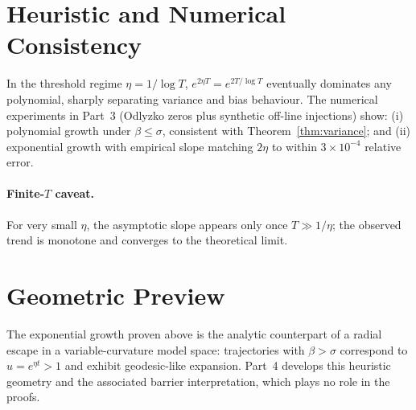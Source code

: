 \section{Heuristic and Numerical Consistency}\label{sec:numerics}

In the threshold regime $\eta=1/\log T$, $e^{2\eta T}=e^{2T/\log T}$
eventually dominates any polynomial, sharply separating variance and bias behaviour.
The numerical experiments in Part~3 (Odlyzko zeros plus synthetic off-line injections)
show:
(i) polynomial growth under $\beta\le\sigma$, consistent with
Theorem~\ref{thm:variance}; and
(ii) exponential growth with empirical slope matching $2\eta$ to within $3\times10^{-4}$ relative error.

\paragraph{Finite-$T$ caveat.}
For very small $\eta$, the asymptotic slope appears only once $T\gg1/\eta$;
the observed trend is monotone and converges to the theoretical limit.

\section{Geometric Preview}\label{sec:geom-preview}

The exponential growth proven above is the analytic counterpart of a
radial escape in a variable-curvature model space:
trajectories with $\beta>\sigma$ correspond to $u=e^{\eta t}>1$
and exhibit geodesic-like expansion.
Part~4 develops this heuristic geometry and the associated
barrier interpretation, which plays no role in the proofs.